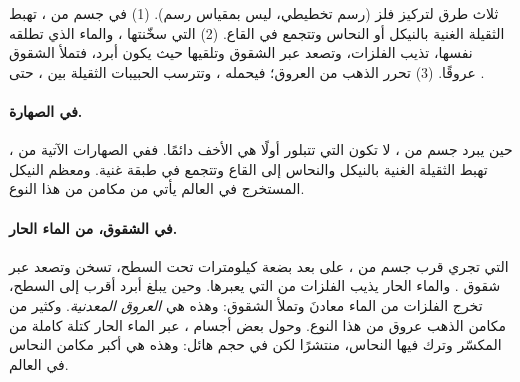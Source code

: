 \begin{omfigure}
{\small ثلاث طرق لتركيز فلز (رسم تخطيطي، ليس بمقياس رسم). (1) في جسم
من ، تهبط  الثقيلة الغنية بالنيكل أو النحاس وتتجمع في
القاع. (2)  التي سخّنتها ، والماء الذي تطلقه
 نفسها، تذيب الفلزات، وتصعد عبر الشقوق وتلقيها حيث يكون 
أبرد، فتملأ الشقوق عروقًا. (3) تحرر  الذهب من العروق؛ فيحمله
، وتترسب الحبيبات الثقيلة بين ، حتى .}
\label{fig:g9:earth-resources:deposits}
\end{omfigure}

\paragraph{في الصهارة.} حين يبرد جسم من ، لا تكون  التي
تتبلور أولًا هي الأخف دائمًا. ففي الصهارات الآتية من ، تهبط
 الثقيلة الغنية بالنيكل والنحاس إلى القاع وتتجمع في طبقة غنية.
ومعظم النيكل المستخرج في العالم يأتي من مكامن من هذا
النوع.

\paragraph{في الشقوق، من الماء الحار.}  التي تجري قرب جسم
من ، على بعد بضعة كيلومترات تحت السطح، تسخن وتصعد عبر شقوق
. والماء الحار يذيب الفلزات من  التي يعبرها. وحين يبلغ
 أبرد أقرب إلى السطح، تخرج الفلزات من الماء معادنَ وتملأ الشقوق:
وهذه هي \emph{العروق المعدنية}. وكثير من مكامن الذهب
عروق من هذا النوع. وحول بعض أجسام ، عبر الماء الحار كتلة كاملة
من  المكسّر وترك فيها النحاس، منتشرًا لكن في حجم هائل: وهذه هي
أكبر مكامن النحاس في
العالم.

